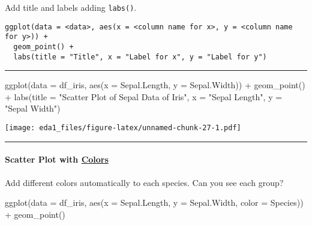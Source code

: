 \documentclass[
]{article}
\newenvironment{Shaded}{\begin{snugshade}}{\end{snugshade}}
\newcommand{\AttributeTok}[1]{\textcolor[rgb]{0.77,0.63,0.00}{#1}}
\newcommand{\FunctionTok}[1]{\textcolor[rgb]{0.00,0.00,0.00}{#1}}
\newcommand{\NormalTok}[1]{#1}
\newcommand{\SpecialCharTok}[1]{\textcolor[rgb]{0.00,0.00,0.00}{#1}}
\newcommand{\StringTok}[1]{\textcolor[rgb]{0.31,0.60,0.02}{#1}}
\begin{document}
Add title and labels adding \texttt{labs()}.

\begin{verbatim}
ggplot(data = <data>, aes(x = <column name for x>, y = <column name for y>)) +
  geom_point() +
  labs(title = "Title", x = "Label for x", y = "Label for y")
\end{verbatim}

\begin{center}\rule{0.5\linewidth}{0.5pt}\end{center}

\begin{Shaded}
\begin{Highlighting}[]
\FunctionTok{ggplot}\NormalTok{(}\AttributeTok{data =}\NormalTok{ df\_iris, }\FunctionTok{aes}\NormalTok{(}\AttributeTok{x =}\NormalTok{ Sepal.Length, }\AttributeTok{y =}\NormalTok{ Sepal.Width)) }\SpecialCharTok{+}
  \FunctionTok{geom\_point}\NormalTok{() }\SpecialCharTok{+} 
  \FunctionTok{labs}\NormalTok{(}\AttributeTok{title =} \StringTok{"Scatter Plot of Sepal Data of Iris"}\NormalTok{, }\AttributeTok{x =} \StringTok{"Sepal Length"}\NormalTok{, }\AttributeTok{y =} \StringTok{"Sepal Width"}\NormalTok{)}
\end{Highlighting}
\end{Shaded}

\texttt{[image: eda1\_files/figure-latex/unnamed-chunk-27-1.pdf]}

\begin{center}\rule{0.5\linewidth}{0.5pt}\end{center}

\hypertarget{scatter-plot-with-colors}{%
\paragraph{\texorpdfstring{Scatter Plot with
\href{https://ggplot2.tidyverse.org/reference/aes_colour_fill_alpha.html}{Colors}}{Scatter Plot with Colors}}\label{scatter-plot-with-colors}}

Add different colors automatically to each species. Can you see each
group?

\begin{Shaded}
\begin{Highlighting}[]
\FunctionTok{ggplot}\NormalTok{(}\AttributeTok{data =}\NormalTok{ df\_iris, }\FunctionTok{aes}\NormalTok{(}\AttributeTok{x =}\NormalTok{ Sepal.Length, }\AttributeTok{y =}\NormalTok{ Sepal.Width, }\AttributeTok{color =}\NormalTok{ Species)) }\SpecialCharTok{+}
  \FunctionTok{geom\_point}\NormalTok{()}
\end{Highlighting}
\end{Shaded}
\end{document}
